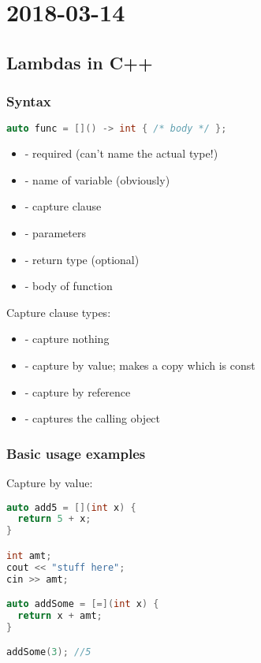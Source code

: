\section{2018-03-14}

\subsection{Lambdas in C++}

\subsubsection{Syntax}

\begin{lstlisting}[language=C++]
auto func = []() -> int { /* body */ };
\end{lstlisting}

\begin{itemize}
  \item {} - required (can't name the actual type!)
  \item {} - name of variable (obviously)
  \item \cpp{[]} - capture clause
  \item \cpp{()} - parameters
  \item {} - return type (optional)
  \item {} - body of function
\end{itemize}

Capture clause types:

\begin{itemize}
  \item \cpp{[]} - capture nothing
  \item \cpp{[=]} - capture by value; makes a copy which is const
  \item \cpp{[&]} - capture by reference
  \item \cpp{[this]} - captures the calling object
\end{itemize}

\subsubsection{Basic usage examples}

Capture by value:

\begin{lstlisting}[language=C++]
auto add5 = [](int x) {
  return 5 + x;
}

int amt;
cout << "stuff here";
cin >> amt;

auto addSome = [=](int x) {
  return x + amt;
}

addSome(3); //5
\end{lstlisting}

